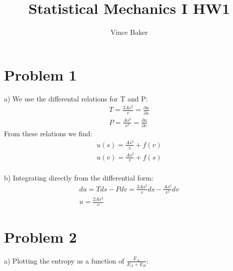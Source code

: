 \documentclass[a4paper,10pt]{article}
\title{Statistical Mechanics I HW1}
\author{Vince Baker}
\numberwithin{equation}{section}
\begin{document}
\maketitle

\section{Problem 1}
a) We use the differental relations for T and P:
\begin{gather}
 T=\frac{3As^2}{v}=\frac{\partial u}{\partial s}\\
 P=\frac{As^3}{v^2}=\frac{\partial u}{\partial v}
\end{gather}
From these relations we find:
\begin{gather}
 u(s) = \frac{As^3}{v}+f(v)\\
 u(v) = \frac{As^3}{v}+f(s)
\end{gather}
\\
b) Integrating directly from the differential form:
\begin{gather}
 du = Tds - Pdv = \frac{3As^2}{v}ds - \frac{As^3}{v^2}dv\\
 u = \frac{2As^3}{v}
\end{gather}


\section{Problem 2}
a) Plotting the entropy as a function of $\frac{E_A}{E_A+E_B}$: \\
\end{document}
